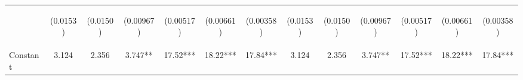 \documentclass[]{article}
\begin{document}
\begin{center}
\begin{tabular}{lcccccccccccc}
\vspace{4pt} & \begin{footnotesize}(0.0153)\end{footnotesize} & \begin{footnotesize}(0.0150)\end{footnotesize} & \begin{footnotesize}(0.00967)\end{footnotesize} & \begin{footnotesize}(0.00517)\end{footnotesize} & \begin{footnotesize}(0.00661)\end{footnotesize} & \begin{footnotesize}(0.00358)\end{footnotesize} & \begin{footnotesize}(0.0153)\end{footnotesize} & \begin{footnotesize}(0.0150)\end{footnotesize} & \begin{footnotesize}(0.00967)\end{footnotesize} & \begin{footnotesize}(0.00517)\end{footnotesize} & \begin{footnotesize}(0.00661)\end{footnotesize} & \begin{footnotesize}(0.00358)\end{footnotesize} \\
Constant & 3.124 & 2.356 & 3.747** & 17.52*** & 18.22*** & 17.84*** & 3.124 & 2.356 & 3.747** & 17.52*** & 18.22*** & 17.84*** \\

\end{tabular}
\end{center}
\end{document}
